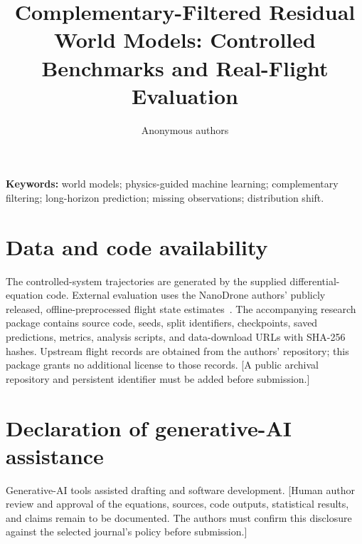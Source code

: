 \documentclass[10pt]{article}
\title{Complementary-Filtered Residual World Models: Controlled Benchmarks and Real-Flight Evaluation}
\author{Anonymous authors}
\date{}
\begin{document}
\maketitle

\noindent\textbf{Keywords:} world models; physics-guided machine learning;
complementary filtering; long-horizon prediction; missing observations;
distribution shift.












\section*{Data and code availability}
The controlled-system trajectories are generated by the supplied differential-equation code. External evaluation uses the NanoDrone authors' publicly released, offline-preprocessed flight state estimates~\cite{busetto2026_nanodrone}. The accompanying research package contains source code, seeds, split identifiers, checkpoints, saved predictions, metrics, analysis scripts, and data-download URLs with SHA-256 hashes. Upstream flight records are obtained from the authors' repository; this package grants no additional license to those records. [A public archival repository and persistent identifier must be added before submission.]

\section*{Declaration of generative-AI assistance}
Generative-AI tools assisted drafting and software development. [Human author review and approval of the equations, sources, code outputs, statistical results, and claims remain to be documented. The authors must confirm this disclosure against the selected journal's policy before submission.]



\end{document}
